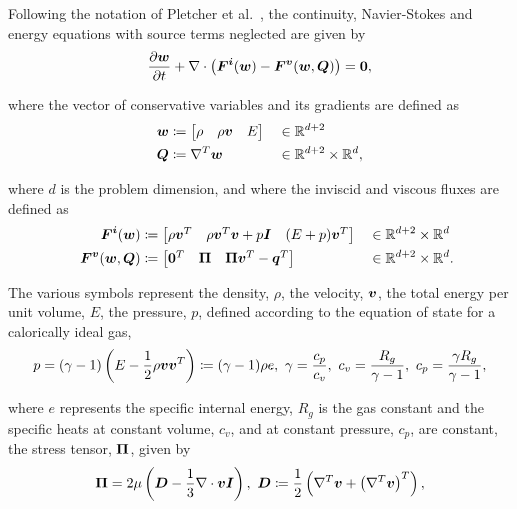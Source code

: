 Following the notation of Pletcher et al.~\cite[Chapter ]{pletcher1997}, the continuity, Navier-Stokes and energy equations with source terms neglected are given by
\begin{align} \label{eq:NavierStokes_std}
\frac{\partial \varv{w}}{\partial t} + 
\nabla \cdot \left( \varv{F^i}(\varv{w}) - \varv{F^v}(\varv{w},\varv{Q}) \right) = \vect{0},
\end{align}

where the vector of conservative variables and its gradients are defined as
\begin{alignat}{3}
\varv{w} & \coloneqq \begin{bmatrix} \rho & \rho\varv{v} & E \end{bmatrix}
&& \in \mathbb{R}^{d+2} \nonumber \\
\varv{Q} & \coloneqq \nabla^T \varv{w}
&& \in \mathbb{R}^{d+2} \times \mathbb{R}^{d}, \label{eq:Gradients}
\end{alignat}

where $d$ is the problem dimension, and where the inviscid and viscous fluxes are defined as
\begin{alignat}{4}
&& \mathit{\bm{{F^i}}}(\mathit{\bm{{w}}}) & \coloneqq
\begin{bmatrix} \rho\mathit{\bm{{v}}}^T & \rho \mathit{\bm{{v}}}^T \mathit{\bm{{v}}} + p \mathit{\bm{{I}}} & (E+p) \mathit{\bm{{v}}}^T \end{bmatrix}
&& \in \mathbb{R}^{d+2} \times \mathbb{R}^{d} \label{eq:F_inviscid} \\
&& \mathit{\bm{{F^v}}}(\mathit{\bm{{w}}},\mathit{\bm{{Q}}}) & \coloneqq
\begin{bmatrix} \mathbf{{0}}^T & \mathit{\bm{{\Pi}}} & \mathit{\bm{{\Pi}}} \mathit{\bm{{v}}}^T - \mathit{\bm{{q}}}^T \end{bmatrix}
&& \in \mathbb{R}^{d+2} \times \mathbb{R}^{d}. \label{eq:F_viscous}
\end{alignat}

The various symbols represent the density, $\rho$, the velocity, $\mathit{\bm{{v}}}$, the total energy per unit volume, $E$, the pressure, $p$, defined according to the equation of state for a calorically ideal gas,
\begin{align*}
p 
=
(\gamma-1) \left( E - \frac{1}{2} \rho \mathit{\bm{{v}}} \mathit{\bm{{v}}}^T \right)
\coloneqq
(\gamma-1) \rho e,\ \gamma = \frac{c_p}{c_v},\ c_v = \frac{R_g}{\gamma-1},\ c_p = \frac{\gamma R_g}{\gamma-1},
\end{align*}

where $e$ represents the specific internal energy, $R_g$ is the gas constant and the specific heats at constant volume, $c_v$, and at constant pressure, $c_p$, are constant, the stress tensor, $\mathit{\bm{{\Pi}}}$, given by
\begin{align*}
\varv{\Pi} = 2\mu \left( \varv{D} - \frac{1}{3} \nabla \cdot \varv{v} \varv{I} \right),\ \varv{D} \coloneqq \frac{1}{2} \left(\nabla^T \varv{v} + \left(\nabla^T \varv{v}\right)^T \right),
\end{align*}

